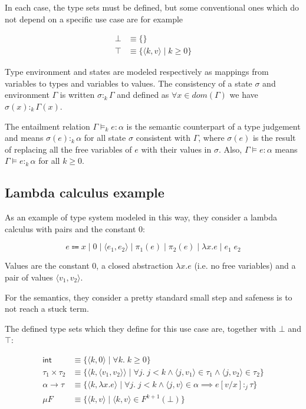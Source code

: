 \documentclass{article}
\begin{document}
In each case, the type sets must be defined, but some conventional 
ones which do not depend on a specific use case are for example 

\begin{align*}
  \bot &\equiv \{\} \\ 
  \top &\equiv \{ \langle k, v \rangle\;|\; k \geq 0 \}
\end{align*}

Type environment and states are modeled respectively as mappings 
from variables to types and variables to values. The consistency 
of a state $\sigma$ and environment $\Gamma$ is written 
$\sigma :_k \Gamma$ and defined as $\forall x \in dom(\Gamma)$
we have $\sigma(x) :_k \Gamma(x)$.

The entailment relation $\Gamma \models_k e: \alpha$ is the semantic 
counterpart of a type judgement and means 
$\sigma(e):_k \alpha$ for all state $\sigma$ consistent with 
$\Gamma$, where $\sigma(e)$ is the result of replacing all the 
free variables of $e$ with their values in $\sigma$. Also, 
$\Gamma \models e : \alpha$ means 
$\Gamma \models e :_k \alpha$ for all $k \geq 0$.

\subsection*{Lambda calculus example}

As an example of type system modeled in this way, they consider 
a lambda calculus with pairs and the constant $0$:

$$
  e \Coloneqq x 
      \;|\; 0 
      \;|\; \langle e_1, e_2 \rangle 
      \;|\; \pi_1(e) 
      \;|\; \pi_2(e)
      \;|\; \lambda x. e 
      \;|\; e_1\;e_2
$$

Values are the constant $0$, a closed abstraction 
$\lambda x.e$ (i.e. no free variables) and a pair of values 
$\langle v_1, v_2 \rangle$.

For the semantics, they consider a pretty standard small step and 
safeness is to not reach a stuck term.

The defined type sets which they define for this use case are,
together with $\bot$ and $\top$:

\begin{align*}
  \mathsf{int} &\equiv \{ \langle k, 0 \rangle \;|\; 
    \forall k.\;k \geq 0 \} \\
  \tau_1 \times \tau_2 &\equiv 
    \{ \langle k, \langle v_1, v_2 \rangle \rangle \;|\; 
          \forall j.\;j < k \land
          \langle j, v_1\rangle \in \tau_1  \land 
          \langle j, v_2 \rangle \in \tau_2
    \} \\
  \alpha \rightarrow \tau &\equiv 
    \{ \langle k, \lambda x. e \rangle \;|\; 
        \forall j.\;j < k \land
        \langle j, v \rangle \in \alpha \implies
          e[v/x] :_j \tau
    \} \\ 
  \mu F &\equiv 
    \{ \langle k, v \rangle \;|\; \langle k, v \rangle \in 
      F^{k + 1}(\bot)
    \}
\end{align*}
\end{document}
